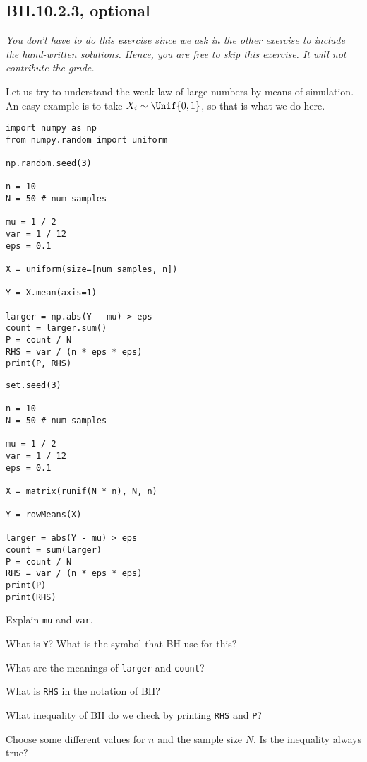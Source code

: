


\subsection{BH.10.2.3, optional}


\emph{You don't have to do this exercise since we ask in the other exercise to include the hand-written solutions. Hence, you are free to skip this exercise. It will not contribute the grade.}



Let us try to understand the weak law of large numbers by means of simulation. An easy example is to take $X_{i}\sim\Unif{0,1}$, so that is what we do here.

\begin{verbatim}
import numpy as np
from numpy.random import uniform

np.random.seed(3)

n = 10
N = 50 # num samples

mu = 1 / 2
var = 1 / 12
eps = 0.1

X = uniform(size=[num_samples, n])

Y = X.mean(axis=1)

larger = np.abs(Y - mu) > eps
count = larger.sum()
P = count / N
RHS = var / (n * eps * eps)
print(P, RHS)
\end{verbatim}

\begin{verbatim}
set.seed(3)

n = 10
N = 50 # num samples

mu = 1 / 2
var = 1 / 12
eps = 0.1

X = matrix(runif(N * n), N, n)

Y = rowMeans(X)

larger = abs(Y - mu) > eps
count = sum(larger)
P = count / N
RHS = var / (n * eps * eps)
print(P)
print(RHS)
\end{verbatim}


\begin{exercise}
Explain \texttt{mu} and \texttt{var}.
\end{exercise}


\begin{exercise}
What is \texttt{Y}? What is the symbol that BH use for this?
\end{exercise}

\begin{exercise}
What are the meanings of \texttt{larger} and \texttt{count}?
\end{exercise}

\begin{exercise}
What is \texttt{RHS} in the notation of BH?
\end{exercise}

\begin{exercise}
What inequality of BH do we check by printing \texttt{RHS}  and \texttt{P}?
\end{exercise}

\begin{exercise}
Choose some different values for $n$ and the sample size $N$. Is the inequality always true?
\end{exercise}



